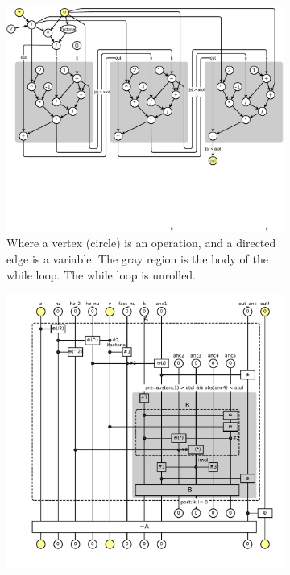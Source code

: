 \documentclass[aps,twocolumn,longbibliography,english,superscriptaddress]{revtex4-1}
\newcommand{\<}{\langle}
\renewcommand{\>}{\rangle}
\theoremstyle{definition}\newtheorem{definition}{\textit{Definition}}
\begin{document}
\begin{figure}[t!]
    \centering
    \begin{subfigure}[t]{0.53\textwidth}
        \centering
        \includegraphics[width=\columnwidth,trim={0 4cm 0 0cm},clip]{images/computational_graph.pdf}
        \caption{Where a vertex (circle) is an operation, and a directed edge is a variable. The gray region is the body of the while loop. The while loop is unrolled.}\label{fig:computational-graph}
    \end{subfigure}%
    \begin{subfigure}[t]{0.47\textwidth}
        \centering
        \includegraphics[width=\columnwidth,trim={0 1cm 0 0cm},clip]{images/fig4.pdf}

\end{subfigure}
\end{figure}
\end{document}
